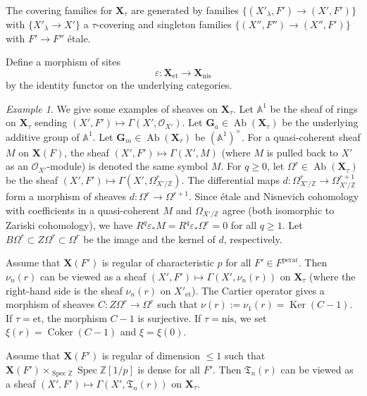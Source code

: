 \documentclass{amsart}
\theoremstyle{remark}
\newtheorem{Ex}[Thm]{Example}
\numberwithin{equation}{subsection}
\newcommand{\Order}{\mathcal{O}}
\newcommand{\Z}{\mathbb{Z}}
\newcommand{\et}{\mathrm{et}}
\newcommand{\Gm}{\mathbf{G}_{m}}
\newcommand{\Ga}{\mathbf{G}_{a}}
\newcommand{\perar}{\mathrm{perar}}
\newcommand{\alg}[1]{\mathbf{#1}}
\newcommand{\nis}{\mathrm{nis}}
\newcommand{\Affine}{\mathbb{A}}
\DeclareMathOperator{\Ker}{Ker}
\DeclareMathOperator{\Coker}{Coker}
\DeclareMathOperator{\Spec}{Spec}
\DeclareMathOperator{\Ab}{Ab}
\begin{document}
The covering families for $\alg{X}_{\tau}$ are generated by
families $\{(X'_{\lambda}, F') \to (X', F')\}$ with $\{X'_{\lambda} \to X'\}$ a $\tau$-covering
and singleton families $\{(X'', F'') \to (X'', F')\}$ with $F' \to F''$ \'etale.

Define a morphism of sites
	\[
			\varepsilon
		\colon
			\alg{X}_{\et}
		\to
			\alg{X}_{\nis}
	\]
by the identity functor on the underlying categories.

\begin{Ex}
	We give some examples of sheaves on $\alg{X}_{\tau}$.
	Let $\Affine^{1}$ be the sheaf of rings on $\alg{X}_{\tau}$
	sending $(X', F') \mapsto \Gamma(X', \Order_{X'})$.
	Let $\Ga \in \Ab(\alg{X}_{\tau})$ be the underlying additive group of $\Affine^{1}$.
	Let $\Gm \in \Ab(\alg{X}_{\tau})$ be $(\Affine^{1})^{\times}$.
	For a quasi-coherent sheaf $M$ on $\alg{X}(F)$,
	the sheaf $(X', F') \mapsto \Gamma(X', M)$
	(where $M$ is pulled back to $X'$ as an $\Order_{X'}$-module)
	is	denoted the same symbol $M$.
	For $q \ge 0$, let $\Omega^{r} \in \Ab(\alg{X}_{\tau})$ be the sheaf
	$(X', F') \mapsto \Gamma(X', \Omega_{X' / \Z}^{r})$.
	The differential maps $d \colon \Omega_{X' / \Z}^{r} \to \Omega_{X' / \Z}^{r + 1}$
	form a morphism of sheaves $d \colon \Omega^{r} \to \Omega^{r + 1}$.
	Since \'etale and Nisnevich cohomology with coefficients in
	a quasi-coherent $M$ and $\Omega_{X' / \Z}$ agree
	(both isomorphic to Zariski cohomology),
	we have $R^{q} \varepsilon_{\ast} M = R^{q} \varepsilon_{\ast} \Omega^{r} = 0$
	for all $q \ge 1$.
	Let $B \Omega^{r} \subset Z \Omega^{r} \subset \Omega^{r}$ be
	the image and the kernel of $d$, respectively.
	
	Assume that $\alg{X}(F')$ is regular of characteristic $p$ for all $F' \in F^{\perar}$.
	Then $\nu_{n}(r)$ can be viewed as a sheaf
	$(X', F') \mapsto \Gamma(X', \nu_{n}(r))$
	on $\alg{X}_{\tau}$
	(where the right-hand side is the sheaf $\nu_{n}(r)$ on $X'_{\et}$).
	The Cartier operator gives a morphism of sheaves
	$C \colon Z \Omega^{r} \to \Omega^{r}$
	such that $\nu(r) := \nu_{1}(r) = \Ker(C - 1)$.
	If $\tau = \et$, the morphism $C - 1$ is surjective.
	If $\tau = \nis$, we set $\xi(r) = \Coker(C - 1)$ and $\xi = \xi(0)$.
	
	
	Assume that $\alg{X}(F')$ is regular of dimension $\le 1$
	such that $\alg{X}(F') \times_{\Spec \Z} \Spec \Z[1 / p]$ is dense for all $F'$.
	Then $\mathfrak{T}_{n}(r)$ can be viewed as a sheaf
	$(X', F') \mapsto \Gamma(X', \mathfrak{T}_{n}(r))$
	on $\alg{X}_{\tau}$.
\end{Ex}
\end{document}
